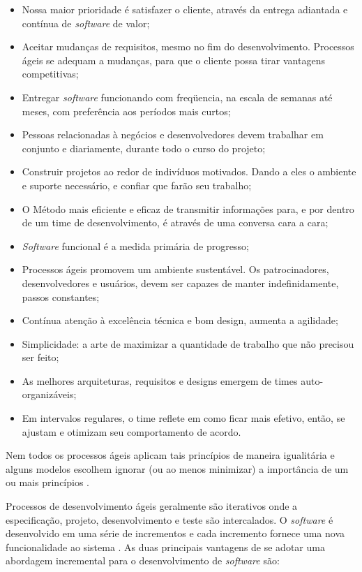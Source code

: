 \begin{itemize}
    \item Nossa maior prioridade é satisfazer o cliente, através da entrega adiantada e contínua de \textit{software} de valor;
    \item Aceitar mudanças de requisitos, mesmo no fim do desenvolvimento. Processos ágeis se adequam a mudanças, para que o cliente possa tirar vantagens competitivas;
    \item Entregar \textit{software} funcionando com freqüencia, na escala de semanas até meses, com preferência aos períodos mais curtos;
    \item Pessoas relacionadas à negócios e desenvolvedores devem trabalhar em conjunto e diariamente, durante todo o curso do projeto;
    \item Construir projetos ao redor de indivíduos motivados. Dando a eles o ambiente e suporte necessário, e confiar que farão seu trabalho;
    \item O Método mais eficiente e eficaz de transmitir informações para, e por dentro de um time de desenvolvimento, é através de uma conversa cara a cara;
    \item \textit{Software} funcional é a medida primária de progresso;
    \item Processos ágeis promovem um ambiente sustentável. Os patrocinadores, desenvolvedores e usuários, devem ser capazes de manter indefinidamente, passos constantes;
    \item Contínua atenção à excelência técnica e bom design, aumenta a agilidade;
    \item Simplicidade: a arte de maximizar a quantidade de trabalho que não precisou ser feito;
    \item As melhores arquiteturas, requisitos e designs emergem de times auto-organizáveis;
    \item Em intervalos regulares, o time reflete em como ficar mais efetivo, então, se ajustam e otimizam seu comportamento de acordo.
\end{itemize}

Nem todos os processos ágeis aplicam tais princípios de maneira igualitária e alguns modelos escolhem ignorar (ou ao menos minimizar) a importância de um ou mais princípios \cite{pressman_2009}.

Processos de desenvolvimento ágeis geralmente são iterativos onde a
especificação, projeto, desenvolvimento e teste são intercalados. O \textit{software} é desenvolvido
em uma série de incrementos e cada incremento fornece uma nova funcionalidade ao sistema \cite{sommerville_2006}. As duas principais
vantagens de se adotar uma abordagem incremental para o desenvolvimento de \textit{software} são:

